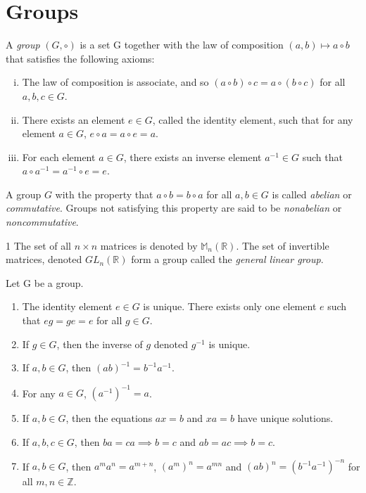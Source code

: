 \section{Groups}

\begin{defn}{1}
	A \textit{group} $(G,\circ)$ is a set G together with the law of composition $(a,b)\mapsto a \circ b$ that satisfies the following axioms:
	\begin{enumerate}[(i)]
		\item The law of composition is associate, and so $(a \circ b) \circ c = a \circ (b \circ c)$ for all $a,b,c \in G$.
		\item There exists an element $e \in G$, called the identity element, such that for any element $a \in G$, $e \circ a = a \circ e = a$.
		\item For each element $a \in G$, there exists an inverse element $a^{-1}\in G$ such that $a \circ a^{-1} = a^{-1} \circ e = e$. 
	\end{enumerate}
\end{defn}

\begin{defn}{1}
	A group $G$ with the property that $a \circ b = b \circ a$ for all $a,b \in G$ is called \textit{abelian} or	\textit{commutative}. Groups not satisfying this property are said to be \textit{nonabelian} or \textit{noncommutative}.
\end{defn}

\begin{defn}{1}
	The set of all $n \times n$ matrices is denoted by $\mathbb{M}_n(\mathbb{R})$. The set of invertible matrices, denoted $GL_n(\mathbb{R})$ form a group called the \textit{general linear group}. 
\end{defn}

\begin{theo}{1}
	Let G be a group.
	\begin{enumerate}
		\item The identity element $e\in G$ is unique. There exists only one element $e$ such that $eg=ge=e$ for all $g\in G$.
		\item If $g\in G$, then the inverse of $g$ denoted $g^{-1}$ is unique.
		\item If $a,b\in G$, then $(ab)^{-1} = b^{-1}a^{-1}$. 
		\item For any $a \in G$, $(a^{-1})^{-1}=a$.
		\item If $a,b \in G$, then the equations $ax=b$ and $xa=b$ have unique solutions.
		\item If $a,b,c \in G$, then $ba=ca \implies b=c$ and $ab=ac \implies b=c$.
		\item If $a,b \in G$, then $a^ma^n=a^{m+n}$, $(a^m)^n = a^{mn}$ and $(ab)^n = (b^{-1}a^{-1})^{-n}$ for all $m,n \in \mathbb{Z}$.
	\end{enumerate}
\end{theo}